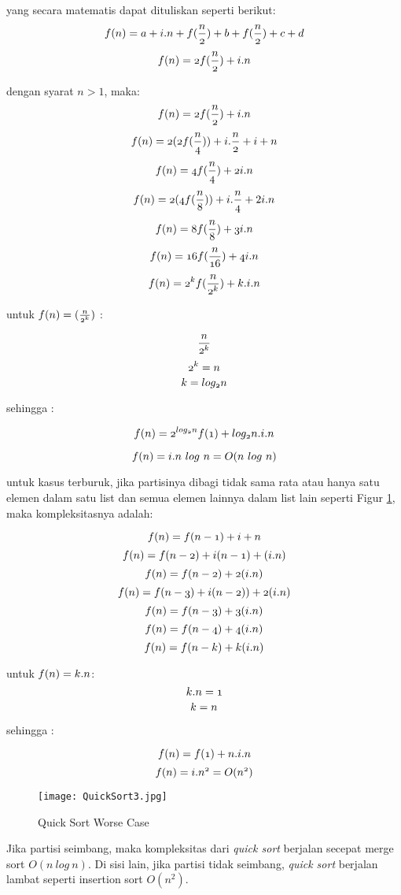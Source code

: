 \documentclass[12pt]{book}%
\begin{document}
yang secara matematis dapat dituliskan seperti berikut:
$$	  \mathnormal{f(n) = a+i.n+f(\frac{n}{2})+b+f(\frac{n}{2})+c+d } $$
$$	  \mathnormal{f(n) = 2f(\frac{n}{2})+i.n } $$

dengan syarat $n > 1$, maka:
$$	  \mathnormal{f(n) = 2f(\frac{n}{2})+i.n } $$
$$	  \mathnormal{f(n) = 2(2f(\frac{n}{4}))+i.\frac{n}{2} } + i+n $$
$$	  \mathnormal{f(n) = 4f(\frac{n}{4})+2i.n } $$
$$	  \mathnormal{f(n) = 2(4f(\frac{n}{8}))+i.\frac{n}{4} }+2i.n $$
$$	  \mathnormal{f(n) = 8f(\frac{n}{8})+3i.n } $$
$$	  \mathnormal{f(n) = 16f(\frac{n}{16})+4i.n } $$
$$	  \mathnormal{f(n) = 2^{k}f(\frac{n}{2^{k}})+k.i.n } $$

untuk $ \mathnormal{f(n) = (\frac{n}{2^{k}})} $ :

$$ \mathnormal{\frac{n}{2^{k}}} $$
$$ \mathnormal{2^{k}=n} $$
$$ \mathnormal{k=log_{2}n} $$

sehingga :

$$	  \mathnormal{f(n) = 2^{log_{2}n}f(1)+log_{2}n.i.n } $$

$$	  \mathnormal{f(n) = i.n\ log\ n = O(n\ log\ n)} $$

untuk kasus terburuk, jika partisinya dibagi tidak sama rata atau hanya satu elemen dalam satu list dan semua elemen lainnya dalam list lain seperti Figur \ref{fig:WorseCaseQuickSort}, maka kompleksitasnya adalah:

$$	  \mathnormal{f(n) = f(n-1)+i+n} $$
$$	  \mathnormal{f(n) = f(n-2)+i(n-1)+(i.n)} $$
$$	  \mathnormal{f(n) = f(n-2)+2(i.n)} $$
$$	  \mathnormal{f(n) = f(n-3)+i(n-2))+2(i.n)} $$
$$	  \mathnormal{f(n) = f(n-3)+3(i.n)} $$
$$	  \mathnormal{f(n) = f(n-4)+4(i.n)} $$
$$	  \mathnormal{f(n) = f(n-k)+k(i.n)} $$

untuk $ \mathnormal{f(n) = k.n  }$:
$$ \mathnormal{ k.n = 1  }$$
$$ \mathnormal{ k = n }$$

sehingga :

$$ \mathnormal{f(n) = f(1) + n.i.n} $$
$$ \mathnormal{f(n) = i.n^{2} = O(n^{2})} $$
		

\begin{figure}[htbp]
\begin{center}
	\texttt{[image: QuickSort3.jpg]}%
	\caption{Quick Sort Worse Case}%
	\label{fig:WorseCaseQuickSort}%
\end{center}
\end{figure}


Jika partisi seimbang, maka kompleksitas dari  \textit{quick sort} berjalan secepat merge sort $O(n\ log\ n)$. Di sisi lain, jika partisi tidak seimbang, \textit{quick sort} berjalan lambat seperti insertion sort $O(n^{2})$.
\end{document}
